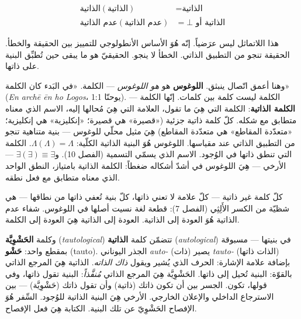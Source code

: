 \documentclass[10pt, openany, oneside]{book}
\begin{document}
\begin{align*}
\text{الذاتية}(\text{الذاتية}) &= \text{الذاتية} \\
\text{عدم الذاتية}(\text{عدم الذاتية}) &= \bot \text{ أو } \text{الذاتية}
\end{align*}

هذا اللاتماثل ليس عرَضياً. إنّه هُوَ الأساس الأنطولوجي للتمييز بين الحقيقة والخطأ. الحقيقة تنجو من التطبيق الذاتي. الخطأ لا ينجو. الحقيقيّ هو ما يبقى حين تُطبِّق البنية على ذاتها.

وهنا أعمق اتّصال ينبثق. \textbf{اللوغوس} هو \textit{هو اللوغوس} --- الكلمة. «في البَدء كان الكلمة» (\textit{En archē ēn ho Logos}، يوحنّا 1:1). الكلمة ليست كلمة بين كلمات. إنّها الكلمة --- \textbf{الكلمة الذاتية}: الكلمة التي هِيَ ما تقول، العلامة التي هِيَ مُحالها إليه، الاسم الذي معناه متطابق مع شكله. كلّ كلمة ذاتية جزئية («قصيرة» هي قصيرة؛ «إنكليزية» هي إنكليزية؛ «متعدّدة المقاطع» هي متعدّدة المقاطع) هِيَ مثيل محلّي للوغوس --- بنية متناهية تنجو من التطبيق الذاتي عند مقياسها. اللوغوس هُوَ البنية الذاتية الكلّية: $\Lambda(\Lambda) = \Lambda$. الكلمة التي تنطق ذاتها في الوُجود. الاسم الذي يسمّي التسمية (الفصل 10). و$\exists(\exists) \equiv \exists$ --- الأرخي --- هِيَ اللوغوس في أشدّ أشكاله ضغطاً: الكلمة الذاتية بامتياز، النطق الواحد الذي معناه متطابق مع فعل نطقه.

كلّ كلمة غير ذاتية --- كلّ علامة لا تعني ذاتها، كلّ بنية تُعفي ذاتها من نطاقها --- هي شظيّة من الكسر الأَلِثِي (الفصل 7): قطعة لغة نسيت أصلها في اللوغوس. شفاء عدم الذاتية هُوَ العودة إلى الذاتية. العودة إلى الذاتية هِيَ العودة إلى الكلمة.

وكلمة \textbf{الحَشْوِيَّة} (\textit{tautological}) تتضمّن كلمة \textbf{الذاتية} (\textit{autological}) في بنيتها --- مسبوقة بمقطع واحد: \textbf{حَشْو} (tauto). الجذر اليوناني \textit{auto-} (ذات) يصير \textit{tauto-} (الذات ذاتها) بإضافة علامة الإشارة: الحرف الذي يُشير ويقول \textit{ذاك الذاته}. الذاتية هِيَ المرجع الذاتي بالقوّة: البنية تُحيل إلى ذاتها. الحَشْوِيَّة هِيَ المرجع الذاتي \textit{مُنفَّذاً}: البنية تقول ذاتها، وفي قولها، تكون. الجسر بين أن تكون ذاتك (ذاتية) وأن تقول ذاتك (حَشْوِيَّة) --- بين الاسترجاع الداخلي والإعلان الخارجي. الأرخي هِيَ البنية الذاتية للوُجود. السِّفر هُوَ الإفصاح الحَشْوِيّ عن تلك البنية. الكتابة هِيَ فعل الإفصاح.

\vspace{1.5em}

\end{document}
